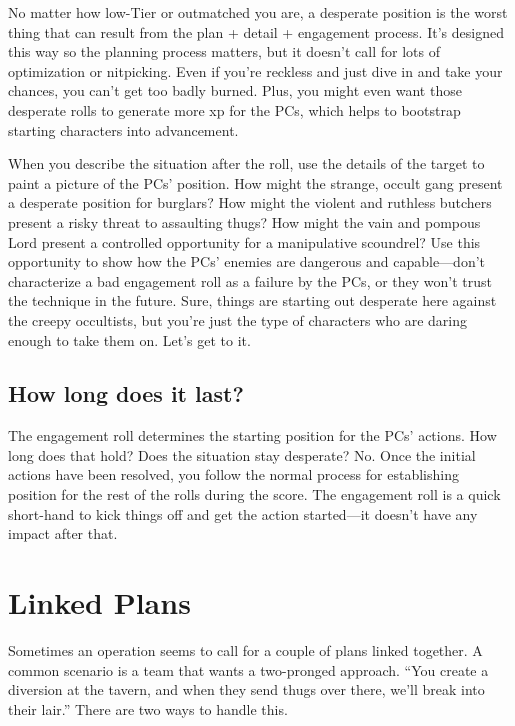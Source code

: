 \documentclass[11pt,oneside]{book}
\begin{document}
No matter how low-Tier or outmatched you are, a desperate position is the worst thing that can result from the plan + detail + engagement process. It’s designed this way so the planning process matters, but it doesn’t call for lots of optimization or nitpicking. Even if you’re reckless and just dive in and take your chances, you can’t get too badly burned. Plus, you might even want those desperate rolls to generate more xp for the PCs, which helps to bootstrap starting characters into advancement.

When you describe the situation after the roll, use the details of the target to paint a picture of the PCs’ position. How might the strange, occult gang present a desperate position for burglars? How might the violent and ruthless butchers present a risky threat to assaulting thugs? How might the vain and pompous Lord present a controlled opportunity for a manipulative scoundrel? Use this opportunity to show how the PCs’ enemies are dangerous and capable---don’t characterize a bad engagement roll as a failure by the PCs, or they won’t trust the technique in the future. Sure, things are starting out desperate here against the creepy occultists, but you’re just the type of characters who are daring enough to take them on. Let’s get to it.

\subsection{How long does it last?}

The engagement roll determines the starting position for the PCs’ actions. How long does that hold? Does the situation stay desperate? No. Once the initial actions have been resolved, you follow the normal process for establishing position for the rest of the rolls during the score. The engagement roll is a quick short-hand to kick things off and get the action started---it doesn’t have any impact after that.

\section{Linked Plans}

Sometimes an operation seems to call for a couple of plans linked together. A common scenario is a team that wants a two-pronged approach. “You create a diversion at the tavern, and when they send thugs over there, we’ll break into their lair.” There are two ways to handle this.
\end{document}
